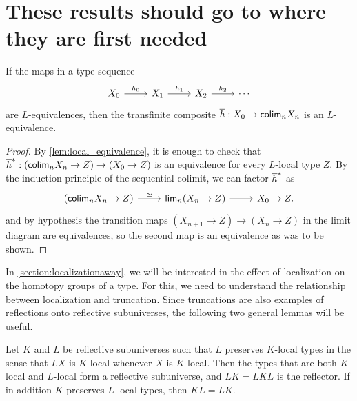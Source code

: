 \section{These results should go to where they are first needed}
\begin{lem}\label{lemma:orthogonalcomposition}
    If the maps in a type sequence
\begin{equation*}
\begin{tikzcd}
X_0 \arrow[r,"h_0"] & X_1 \arrow[r,"h_1"] & X_2 \arrow[r,"h_2"] & \cdots
\end{tikzcd}
\end{equation*}
    are $L$-equivalences, then the transfinite composite $\overline{h} : X_0 \to \mathsf{colim}_n X_n$ is an $L$-equiva\-lence.
\end{lem}

\begin{proof}
    By \cref{lem:local_equivalence}, it is enough to check that
    ${\overline{h}}^\ast : (\mathsf{colim}_n X_n \to Z) \to (X_0 \to Z)$
    is an equivalence for every $L$-local type $Z$.
    By the induction principle of the sequential colimit,
    we can factor ${\overline{h}}^\ast$ as
\begin{equation*}
\begin{tikzcd}
(\colim_n X_n \to Z) \arrow[r,"\eqvsym"] & \mathsf{lim}_n (X_n\to Z) \arrow[r] & X_0\to Z.
\end{tikzcd}
\end{equation*}
    and by hypothesis the transition maps $(X_{n+1} \to Z) \to (X_n \to Z)$ in the limit diagram are equivalences,
    so the second map is an equivalence as was to be shown.
\end{proof}

In \cref{section:localizationaway}, we will be interested in the effect of localization on the homotopy groups of a type.
For this, we need to understand the relationship between localization and truncation.
Since truncations are also examples of reflections onto reflective subuniverses,
the following two general lemmas will be useful.

\begin{lem}\label{lemma:commutelocalization}
    Let $K$ and $L$ be reflective subuniverses such that $L$ preserves $K$-local types in the sense that $LX$ is $K$-local whenever $X$ is $K$-local.
    Then the types that are both $K$-local and $L$-local form a reflective subuniverse,
    and $LK = LKL$ is the reflector.
    If in addition $K$ preserves $L$-local types, then $KL = LK$.
\end{lem}

